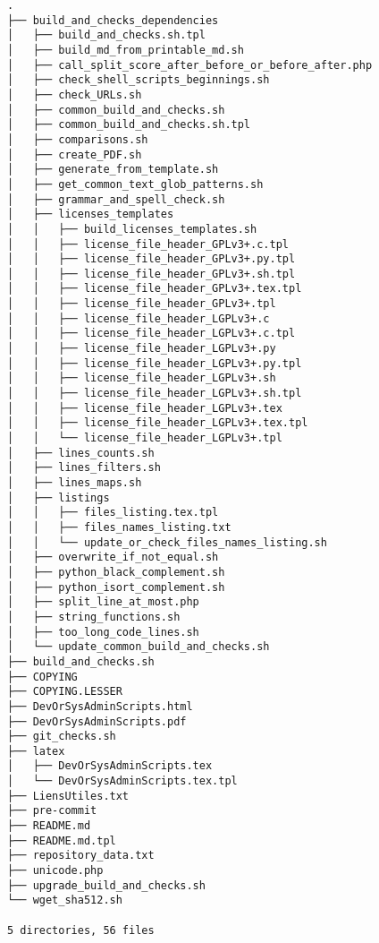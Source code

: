 \documentclass{article}
\begin{document}
\begin{verbatim}
.
├── build_and_checks_dependencies
│   ├── build_and_checks.sh.tpl
│   ├── build_md_from_printable_md.sh
│   ├── call_split_score_after_before_or_before_after.php
│   ├── check_shell_scripts_beginnings.sh
│   ├── check_URLs.sh
│   ├── common_build_and_checks.sh
│   ├── common_build_and_checks.sh.tpl
│   ├── comparisons.sh
│   ├── create_PDF.sh
│   ├── generate_from_template.sh
│   ├── get_common_text_glob_patterns.sh
│   ├── grammar_and_spell_check.sh
│   ├── licenses_templates
│   │   ├── build_licenses_templates.sh
│   │   ├── license_file_header_GPLv3+.c.tpl
│   │   ├── license_file_header_GPLv3+.py.tpl
│   │   ├── license_file_header_GPLv3+.sh.tpl
│   │   ├── license_file_header_GPLv3+.tex.tpl
│   │   ├── license_file_header_GPLv3+.tpl
│   │   ├── license_file_header_LGPLv3+.c
│   │   ├── license_file_header_LGPLv3+.c.tpl
│   │   ├── license_file_header_LGPLv3+.py
│   │   ├── license_file_header_LGPLv3+.py.tpl
│   │   ├── license_file_header_LGPLv3+.sh
│   │   ├── license_file_header_LGPLv3+.sh.tpl
│   │   ├── license_file_header_LGPLv3+.tex
│   │   ├── license_file_header_LGPLv3+.tex.tpl
│   │   └── license_file_header_LGPLv3+.tpl
│   ├── lines_counts.sh
│   ├── lines_filters.sh
│   ├── lines_maps.sh
│   ├── listings
│   │   ├── files_listing.tex.tpl
│   │   ├── files_names_listing.txt
│   │   └── update_or_check_files_names_listing.sh
│   ├── overwrite_if_not_equal.sh
│   ├── python_black_complement.sh
│   ├── python_isort_complement.sh
│   ├── split_line_at_most.php
│   ├── string_functions.sh
│   ├── too_long_code_lines.sh
│   └── update_common_build_and_checks.sh
├── build_and_checks.sh
├── COPYING
├── COPYING.LESSER
├── DevOrSysAdminScripts.html
├── DevOrSysAdminScripts.pdf
├── git_checks.sh
├── latex
│   ├── DevOrSysAdminScripts.tex
│   └── DevOrSysAdminScripts.tex.tpl
├── LiensUtiles.txt
├── pre-commit
├── README.md
├── README.md.tpl
├── repository_data.txt
├── unicode.php
├── upgrade_build_and_checks.sh
└── wget_sha512.sh

5 directories, 56 files
\end{verbatim}
\end{document}
